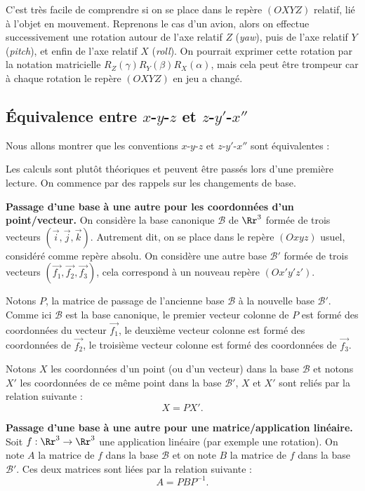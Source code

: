 \documentclass[11pt,class=report,crop=false]{standalone}
\begin{document}
C'est très facile de comprendre si on se place dans le repère  $(OXYZ)$ relatif, lié à l'objet en mouvement. Reprenons le cas d'un avion, alors on effectue successivement une rotation autour de l'axe relatif $Z$ (\emph{yaw}), puis de l'axe relatif $Y$ (\emph{pitch}), et enfin de l'axe relatif $X$ (\emph{roll}).
On pourrait exprimer cette rotation par la notation matricielle $R_Z(\gamma) R_Y(\beta) R_X(\alpha)$, mais cela peut être trompeur car à chaque rotation le repère $(OXYZ)$ en jeu a changé.


\subsection{Équivalence entre $x$-$y$-$z$ et $z$-$y'$-$x''$}

Nous allons montrer que les conventions $x$-$y$-$z$ et $z$-$y'$-$x''$ sont équivalentes :



Les calculs sont plutôt théoriques et peuvent être passés lors d'une première lecture.
On commence par des rappels sur les changements de base.


\textbf{Passage d'une base à une autre pour les coordonnées d'un point/vecteur.}
On considère la base canonique $\mathcal{B}$ de $\Rr^3$ formée de trois vecteurs $(\vec i, \vec j, \vec k)$. Autrement dit, on se place dans le repère $(Oxyz)$ usuel, considéré comme repère absolu.
On considère une autre base $\mathcal{B}'$ formée de trois vecteurs $(\vec{f_1},\vec{f_2},\vec{f_3})$, cela correspond à un nouveau repère $(Ox'y'z')$.

Notons $P$, la matrice de passage de l'ancienne base $\mathcal{B}$ à la nouvelle base $\mathcal{B}'$.
Comme ici $\mathcal{B}$ est la base canonique, le premier vecteur colonne de $P$ est formé des coordonnées du vecteur $\vec{f_1}$, le deuxième vecteur colonne  est formé des coordonnées de $\vec{f_2}$, le troisième vecteur colonne  est formé des coordonnées de $\vec{f_3}$.

Notons $X$ les coordonnées d'un point (ou d'un vecteur) dans la base $\mathcal{B}$ et notons $X'$ les coordonnées de ce même point dans la base $\mathcal{B}'$, $X$ et $X'$ sont reliés par la relation suivante :
$$X = PX'.$$

\medskip

\textbf{Passage d'une base à une autre pour une matrice/application linéaire.}
Soit $f : \Rr^3 \to \Rr^3$ une application linéaire (par exemple une rotation). On note $A$ la matrice de $f$ dans la base $\mathcal{B}$ et on note $B$ la matrice de $f$ dans la base $\mathcal{B}'$. Ces deux matrices sont liées par la relation suivante :
$$A = PBP^{-1}.$$
\end{document}
